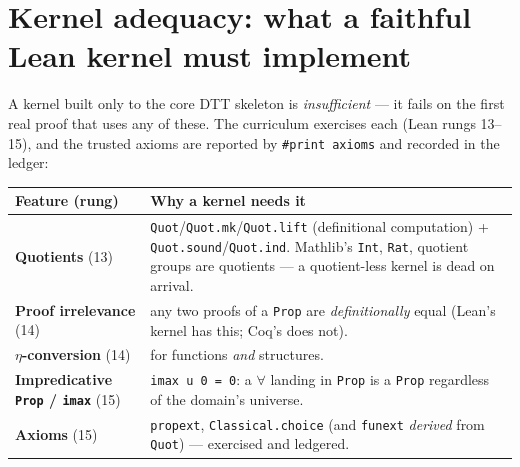 \documentclass[11pt]{article}
\begin{document}
\section{Kernel adequacy: what a faithful Lean kernel must implement}\label{sec:adeq}
A kernel built only to the core DTT skeleton is \emph{insufficient} --- it fails on the first real
proof that uses any of these. The curriculum exercises each (Lean rungs 13--15), and the trusted
axioms are reported by \texttt{\#print axioms} and recorded in the ledger:
\begin{center}\small
\begin{tabular}{@{}lp{8.0cm}@{}}
\toprule
Feature (rung) & Why a kernel needs it \\
\midrule
\textbf{Quotients} (13) & \texttt{Quot}/\texttt{Quot.mk}/\texttt{Quot.lift} (definitional computation)
+ \texttt{Quot.sound}/\texttt{Quot.ind}. Mathlib's \texttt{Int}, \texttt{Rat}, quotient groups are
quotients --- a quotient-less kernel is dead on arrival. \\
\textbf{Proof irrelevance} (14) & any two proofs of a \texttt{Prop} are \emph{definitionally} equal
(Lean's kernel has this; Coq's does not). \\
\textbf{$\eta$-conversion} (14) & for functions \emph{and} structures. \\
\textbf{Impredicative \texttt{Prop} / \texttt{imax}} (15) & \texttt{imax\,u\,0 = 0}: a $\forall$ landing
in \texttt{Prop} is a \texttt{Prop} regardless of the domain's universe. \\
\textbf{Axioms} (15) & \texttt{propext}, \texttt{Classical.choice} (and \texttt{funext} \emph{derived}
from \texttt{Quot}) --- exercised and ledgered. \\
\bottomrule
\end{tabular}
\end{center}
\end{document}
